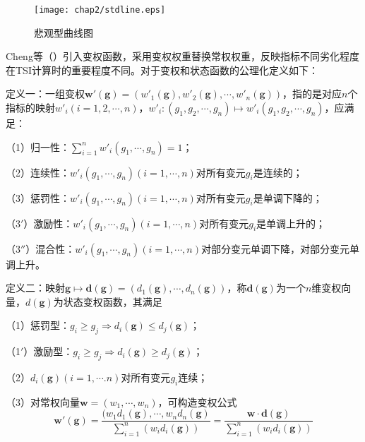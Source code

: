 \begin{figure}[htb!]
    \centering
    \texttt{[image: chap2/stdline.eps]}
    \caption{悲观型曲线图}
    \label{fig:悲观型曲线图}
\end{figure}

Cheng等（\citeyear{cheng1999evaluating}）引入变权函数，采用变权权重替换常权权重，反映指标不同劣化程度在TSI计算时的重要程度不同。对于变权和状态函数的公理化定义如下：

定义一：一组变权$\mathbf{{w}'}(\mathbf{g})=\left( {{{{w}'}}_{1}}(\mathbf{g}),{{{{w}'}}_{2}}(\mathbf{g}),\cdots ,{{{{w}'}}_{n}}(\mathbf{g}) \right)$，指的是对应$n$个指标的映射${{{w}'}_{i}}(i=1,2,\cdots ,n)$，${{{w}'}_{i}}:({{g}_{1}},{{g}_{2}},\cdots ,{{g}_{n}})\mapsto {{{w}'}_{i}}({{g}_{1}},{{g}_{2}},\cdots ,{{g}_{n}})$，应满足：

（1）归一性：$\sum\limits_{i=1}^{n}{{{{{w}'}}_{i}}({{g}_{1}},\cdots ,{{g}_{n}})=1}$；

（2）连续性：${{{w}'}_{i}}({{g}_{1}},\cdots ,{{g}_{n}})(i=1,\cdots ,n)$对所有变元$g_i$是连续的；

（3）惩罚性：${{{w}'}_{i}}({{g}_{1}},\cdots ,{{g}_{n}})(i=1,\cdots ,n)$对所有变元$g_i$是单调下降的；

（3$'$）激励性：${{{w}'}_{i}}({{g}_{1}},\cdots ,{{g}_{n}})(i=1,\cdots ,n)$对所有变元$g_i$是单调上升的；

（3$''$）混合性：${{{w}'}_{i}}({{g}_{1}},\cdots ,{{g}_{n}})(i=1,\cdots ,n)$对部分变元单调下降，对部分变元单调上升。

定义二：映射$\mathbf{g}\mapsto \mathbf{d}(\mathbf{g})=({{d}_{1}}(\mathbf{g}),\cdots ,{{d}_{n}}(\mathbf{g}))$，称$\mathbf{d}(\mathbf{g})$为一个$n$维变权向量，${d}(\mathbf{g})$为状态变权函数，其满足

（1）惩罚型：${{g}_{i}}\ge {{g}_{j}}\Rightarrow {{d}_{i}}(\mathbf{g})\le {{d}_{j}}(\mathbf{g})$；

（1$'$）激励型：${{g}_{i}}\ge {{g}_{j}}\Rightarrow {{d}_{i}}(\mathbf{g})\ge {{d}_{j}}(\mathbf{g})$；

（2）${{d}_{i}}(\mathbf{g})(i=1,\cdots .n)$对所有变元$g_i$连续；

（3）对常权向量$\mathbf{w}=({{w}_{1}},\cdots ,{{w}_{n}})$，可构造变权公式
\begin{equation}
    \label{equ:状态变权函数}
    \mathbf{{w}'}(\mathbf{g})=\frac{({{w}_{1}}{{d}_{1}}(\mathbf{g}),\cdots ,{{w}_{n}}{{d}_{n}}(\mathbf{g})}{\sum\limits_{i=1}^{n}{({{w}_{i}}{{d}_{i}}(\mathbf{g}))}}=\frac{\mathbf{w}\cdot \mathbf{d}(\mathbf{g})}{\sum\limits_{i=1}^{n}{({{w}_{i}}{{d}_{i}}(\mathbf{g}))}}
\end{equation}

